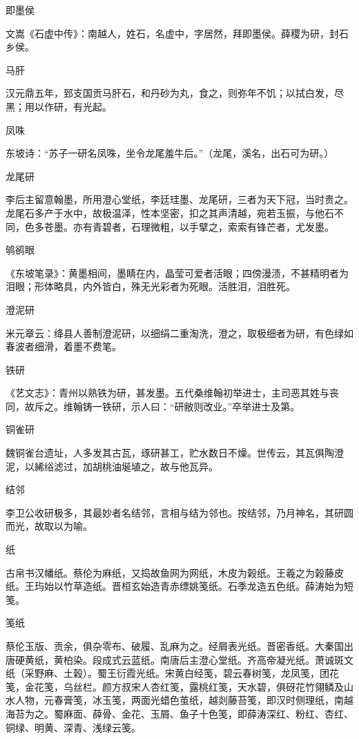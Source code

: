 \documentclass[a4paper,12pt,UTF8,twoside]{ctexbook}
\begin{document}
    即墨侯
    
    文嵩《石虚中传》：南越人，姓石，名虚中，字居然，拜即墨侯。薛稷为研，封石乡侯。
    
    马肝
    
    汉元鼎五年，郅支国贡马肝石，和丹砂为丸，食之，则弥年不饥；以拭白发，尽黑；用以作研，有光起。
    
    凤咮
    
    东坡诗：“苏子一研名凤咮，坐令龙尾羞牛后。”（龙尾，溪名，出石可为研。）
    
    龙尾研
    
    李后主留意翰墨，所用澄心堂纸，李廷珪墨、龙尾研，三者为天下冠，当时贵之。龙尾石多产于水中，故极温泽，性本坚密，扣之其声清越，宛若玉振，与他石不同，色多苍墨。亦有青碧者，石理微粗，以手擘之，索索有锋芒者，尤发墨。
    
    鸲鹆眼
    
    《东坡笔录》：黄墨相间，墨睛在内，晶莹可爱者活眼；四傍漫渍，不甚精明者为泪眼；形体略具，内外皆白，殊无光彩者为死眼。活胜泪，泪胜死。
    
    澄泥研
    
    米元章云：绛县人善制澄泥研，以细绢二重淘洗，澄之，取极细者为研，有色绿如春波者细滑，着墨不费笔。
    
    铁研
    
    《艺文志》：青州以熟铁为研，甚发墨。五代桑维翰初举进士，主司恶其姓与丧同，故斥之。维翰铸一铁研，示人曰：“研敝则改业。”卒举进士及第。
    
    铜雀研
    
    魏铜雀台遗址，人多发其古瓦，琢研甚工，贮水数日不燥。世传云，其瓦俱陶澄泥，以絺绤滤过，加胡桃油埏埴之，故与他瓦异。
    
    结邻
    
    李卫公收研极多，其最妙者名结邻，言相与结为邻也。按结邻，乃月神名，其研圆而光，故取以为喻。
    
    纸
    
    古帛书汉幡纸。蔡伦为麻纸，又捣故鱼网为网纸，木皮为榖纸。王羲之为榖藤皮纸。王玙始以竹草造纸。晋桓玄始造青赤缥姚笺纸。石季龙造五色纸。薛涛始为短笺。
    
    笺纸
    
    蔡伦玉版、贡余，俱杂零布、破履、乱麻为之。经屑表光纸。晋密香纸。大秦国出唐硬黄纸，黄柏染。段成式云蓝纸。南唐后主澄心堂纸。齐高帝凝光纸。萧诚斑文纸（采野麻、土榖）。蜀王衍霞光纸。宋黄白经笺，碧云春树笺，龙凤笺，团花笺，金花笺，乌丝栏。颜方叔宋人杏红笺，露桃红笺，天水碧，俱砑花竹翎鳞及山水人物，元春膏笺，冰玉笺，两面光蜡色茧纸，越剡藤苔笺，即汉时侧理纸，南越海苔为之。蜀麻面、薛骨、金花、玉屑、鱼子十色笺，即薛涛深红、粉红、杏红、铜绿、明黄、深青、浅绿云笺。
    
\end{document}
